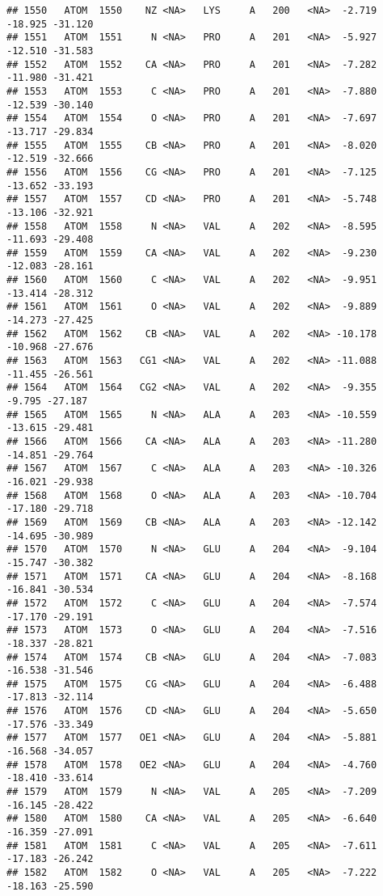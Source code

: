 \documentclass[
]{article}
\begin{document}
\begin{verbatim}
## 1550   ATOM  1550    NZ <NA>   LYS     A   200   <NA>  -2.719 -18.925 -31.120
## 1551   ATOM  1551     N <NA>   PRO     A   201   <NA>  -5.927 -12.510 -31.583
## 1552   ATOM  1552    CA <NA>   PRO     A   201   <NA>  -7.282 -11.980 -31.421
## 1553   ATOM  1553     C <NA>   PRO     A   201   <NA>  -7.880 -12.539 -30.140
## 1554   ATOM  1554     O <NA>   PRO     A   201   <NA>  -7.697 -13.717 -29.834
## 1555   ATOM  1555    CB <NA>   PRO     A   201   <NA>  -8.020 -12.519 -32.666
## 1556   ATOM  1556    CG <NA>   PRO     A   201   <NA>  -7.125 -13.652 -33.193
## 1557   ATOM  1557    CD <NA>   PRO     A   201   <NA>  -5.748 -13.106 -32.921
## 1558   ATOM  1558     N <NA>   VAL     A   202   <NA>  -8.595 -11.693 -29.408
## 1559   ATOM  1559    CA <NA>   VAL     A   202   <NA>  -9.230 -12.083 -28.161
## 1560   ATOM  1560     C <NA>   VAL     A   202   <NA>  -9.951 -13.414 -28.312
## 1561   ATOM  1561     O <NA>   VAL     A   202   <NA>  -9.889 -14.273 -27.425
## 1562   ATOM  1562    CB <NA>   VAL     A   202   <NA> -10.178 -10.968 -27.676
## 1563   ATOM  1563   CG1 <NA>   VAL     A   202   <NA> -11.088 -11.455 -26.561
## 1564   ATOM  1564   CG2 <NA>   VAL     A   202   <NA>  -9.355  -9.795 -27.187
## 1565   ATOM  1565     N <NA>   ALA     A   203   <NA> -10.559 -13.615 -29.481
## 1566   ATOM  1566    CA <NA>   ALA     A   203   <NA> -11.280 -14.851 -29.764
## 1567   ATOM  1567     C <NA>   ALA     A   203   <NA> -10.326 -16.021 -29.938
## 1568   ATOM  1568     O <NA>   ALA     A   203   <NA> -10.704 -17.180 -29.718
## 1569   ATOM  1569    CB <NA>   ALA     A   203   <NA> -12.142 -14.695 -30.989
## 1570   ATOM  1570     N <NA>   GLU     A   204   <NA>  -9.104 -15.747 -30.382
## 1571   ATOM  1571    CA <NA>   GLU     A   204   <NA>  -8.168 -16.841 -30.534
## 1572   ATOM  1572     C <NA>   GLU     A   204   <NA>  -7.574 -17.170 -29.191
## 1573   ATOM  1573     O <NA>   GLU     A   204   <NA>  -7.516 -18.337 -28.821
## 1574   ATOM  1574    CB <NA>   GLU     A   204   <NA>  -7.083 -16.538 -31.546
## 1575   ATOM  1575    CG <NA>   GLU     A   204   <NA>  -6.488 -17.813 -32.114
## 1576   ATOM  1576    CD <NA>   GLU     A   204   <NA>  -5.650 -17.576 -33.349
## 1577   ATOM  1577   OE1 <NA>   GLU     A   204   <NA>  -5.881 -16.568 -34.057
## 1578   ATOM  1578   OE2 <NA>   GLU     A   204   <NA>  -4.760 -18.410 -33.614
## 1579   ATOM  1579     N <NA>   VAL     A   205   <NA>  -7.209 -16.145 -28.422
## 1580   ATOM  1580    CA <NA>   VAL     A   205   <NA>  -6.640 -16.359 -27.091
## 1581   ATOM  1581     C <NA>   VAL     A   205   <NA>  -7.611 -17.183 -26.242
## 1582   ATOM  1582     O <NA>   VAL     A   205   <NA>  -7.222 -18.163 -25.590

\end{verbatim}
\end{document}
